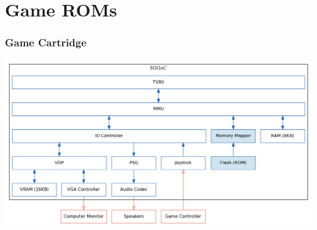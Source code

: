 \documentclass{beamer}
\begin{document}
\section{Game ROMs}
\begin{frame}
    \frametitle{Game Cartridge}
    \begin{center}
        \includegraphics[width=\textwidth]{../block_diagrams/block_diagram_internal_cart.png}
    \end{center}
\end{frame}
\end{document}
